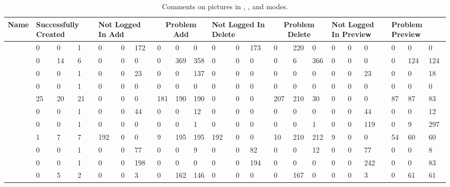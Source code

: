   \begin{table*}[htbp]
    \centering
    {\scriptsize
      \begin{tabular}{|l|p{3ex}p{3ex}p{4ex}|p{3ex}p{3ex}p{4ex}|p{3ex}p{3ex}p{4ex}|p{3ex}p{3ex}p{4ex}|p{3ex}p{3ex}p{4ex}|p{3ex}p{3ex}p{4ex}|p{3ex}p{3ex}p{4ex}|}
        \hline
        Name & \multicolumn{3}{|p{8ex}|}{Successfully Created} & \multicolumn{3}{|p{12ex}|}{Not Logged In Add} & \multicolumn{3}{|c|}{Problem Add} & \multicolumn{3}{|p{12ex}|}{Not Logged In Delete} & \multicolumn{3}{|c|}{Problem Delete} & \multicolumn{3}{|p{12ex}|}{Not Logged In Preview} & \multicolumn{3}{|p{10ex}|}{Problem Preview} \\
        \hline
        \acunetix{} & 0 & 0 & 1 & 0 & 0 & 172 & 0 & 0 & 0 & 0 & 0 & 173 & 0 & 220 & 0 & 0 & 0 & 0 & 0 & 0 & 0\\
        \appscan{} & 0 & 14 & 6 & 0 & 0 & 0 & 0 & 369 & 358 & 0 & 0 & 0 & 0 & 6 & 366 & 0 & 0 & 0 & 0 & 124 & 124 \\
        \burp{} & 0 & 0 & 1 & 0 & 0 & 23 & 0 & 0 & 137 & 0 & 0 & 0 & 0 & 0 & 0 & 0 & 0 & 23 & 0 & 0 & 18 \\
        \grendelscan{} & 0 & 0 & 1 & 0 & 0 & 0 & 0 & 0 & 0 & 0 & 0 & 0 & 0 & 0 & 0 & 0 & 0 & 0 & 0 & 0 & 0 \\
        \hailstorm{} & 25 & 20 & 21 & 0 & 0 & 0 & 181 & 190 & 190 & 0 & 0 & 0 & 207 & 210 & 30 & 0 & 0 & 0 & 87 & 87 & 83 \\
        \milescan{} & 0 & 0 & 1 & 0 & 0 & 44 & 0 & 0 & 12 & 0 & 0 & 0 & 0 & 0 & 0 & 0 & 0 & 44 & 0 & 0 & 12 \\
        \nstalker{} & 0 & 0 & 1 & 0 & 0 & 0 & 0 & 0 & 1 & 0 & 0 & 0 & 0 & 0 & 1 & 0 & 0 & 119 & 0 & 9 & 297 \\
        \ntospider{} & 1 & 7 & 7 & 192 & 0 & 0 & 9 & 195 & 195 & 192 & 0 & 0 & 10 & 210 & 212 & 9 & 0 & 0 & 54 & 60 & 60 \\
        \paros{} & 0 & 0 & 1 & 0 & 0 & 77 & 0 & 0 & 9 & 0 & 0 & 82 & 0 & 0 & 12 & 0 & 0 & 77 & 0 & 0 & 8 \\
        \waf{} & 0 & 0 & 1 & 0 & 0 & 198 & 0 & 0 & 0 & 0 & 0 & 194 & 0 & 0 & 0 & 0 & 0 & 242 & 0 & 0 & 83 \\
        \webinspect{} & 0 & 5 & 2 & 0 & 0 & 3 & 0 & 162 & 146 & 0 & 0 & 0 & 0 & 167 & 0 & 0 & 0 & 3 & 0 & 61 & 61 \\
        \hline
    \end{tabular}}
    \caption{Comments on pictures in \initial{}, \config{}, and \manual{} modes.}
  \end{table*}

